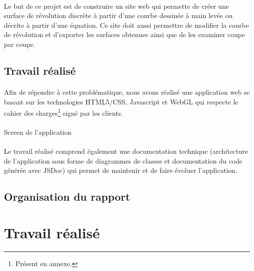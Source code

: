 \documentclass{scrartcl}
\begin{document}
\paragraph{}
Le but de ce projet est de construire un site web qui permette de créer une surface de révolution discrète à partir d'une courbe dessinée à main levée ou décrite à partir d'une équation. Ce site doit aussi permettre de modifier la courbe de révolution et d'exporter les surfaces obtenues ainsi que de les examiner coupe par coupe.

\subsection{Travail réalisé}
\paragraph{}
Afin de répondre à cette problématique, nous avons réalisé une application web se basant sur les technologies HTML5/CSS, Javascript et WebGL qui respecte le cahier des charges\footnote{Présent en annexe.} signé par les clients.
\paragraph{}
\begin{center}
Screen de l'application
\end{center}
\paragraph{}
Le travail réalisé comprend également une documentation technique (architecture de l'application sous forme de diagrammes de classes et documentation du code générée avec JSDoc) qui permet de maintenir et de faire évoluer l'application.

\subsection{Organisation du rapport}
\paragraph{}
\newpage


\section{Travail réalisé}
\end{document}
